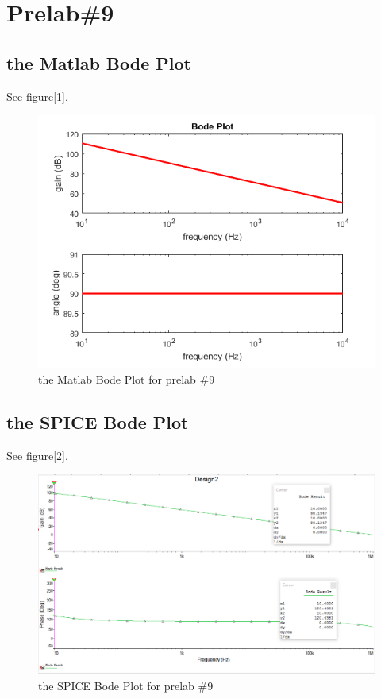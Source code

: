 \documentclass{IEEEtran}
\begin{document}
	\section{\textbf{Prelab\#9}}
	\subsection{the Matlab Bode Plot}
	See figure[\ref{fig:901}].
	\begin{figure}[!htbp]
		\centering
		\begin{framed}
			\includegraphics[width=\linewidth]{images/9.png}
			\caption{the Matlab Bode Plot for prelab \#9}
			\label{fig:901}
		\end{framed}
	\end{figure}
	\subsection{the SPICE Bode Plot}
	See figure[\ref{fig:902}].
	\begin{figure}[!htbp]
		\centering
		\begin{framed}
			\includegraphics[width=\linewidth]{images/9_2.PNG}
			\caption{the SPICE Bode Plot for prelab \#9}
			\label{fig:902}
		\end{framed}
	\end{figure}
\end{document}
